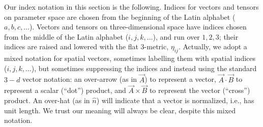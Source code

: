 \documentclass[11pt]{report}
\begin{document}
Our index notation in this section is the following. Indices for vectors and
tensors on parameter space are chosen from the beginning of the
Latin alphabet ($a,b,c,\ldots$).
Vectors and tensors on three-dimensional space have indices
chosen from the middle of the Latin alphabet ($i,j,k,\ldots$),
and run over $1,2,3$; their indices are raised and lowered with
the flat 3-metric, $\eta_{ij}$.
Actually,  we adopt a mixed notation for spatial vectors, sometimes
labelling them with spatial indices ($i,j,k,\ldots$), but sometimes
suppressing the indices and instead
using the standard $3-d$ vector notation: an over-arrow (as in $\vec A$)
to represent a vector, $\vec A \cdot \vec B$ to represent
a scalar (``dot'') product, and $\vec A \times \vec B$
to represent the vector (``cross'') product.
An over-hat (as in $\hat n$)
will indicate that a vector is normalized, i.e., has unit length. We trust our
meaning will always be clear, despite this mixed notation.


\end{document}

